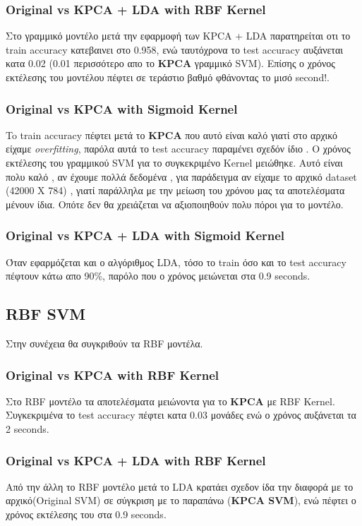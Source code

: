 \subsubsection{Original vs KPCA + LDA with RBF Kernel}
Στο γραμμικό μοντέλο μετά την εφαρμοφή των KPCA + LDA  παρατηρείται οτι το train accuracy κατεβαινει στο 0.958, ενώ ταυτόχρονα το test accuracy αυξάνεται κατα 0.02 (0.01 περισσότερο απο το \textbf{KPCA} γραμμικό SVM). Επίσης ο χρόνος εκτέλεσης του μοντέλου πέφτει σε τεράστιο βαθμό φθάνοντας το μισό second!.

\subsubsection{Original vs KPCA with Sigmoid Kernel}
To train accuracy πέφτει μετά το \textbf{KPCA} που αυτό είναι καλό γιατί στο αρχικό είχαμε \emph{overfitting}, παρόλα αυτά το test accuracy παραμένει σχεδόν ίδιο . Ο χρόνος εκτέλεσης του
γραμμικού SVM για το συγκεκριμένο Kernel μειώθηκε. Αυτό είναι πολυ καλό , αν έχουμε πολλά δεδομένα , για παράδειγμα αν είχαμε το αρχικό dataset (42000 Χ 784) , γιατί παράλληλα με την μείωση του χρόνου μας τα αποτελέσματα μένουν ίδια. Οπότε δεν θα χρειάζεται να αξιοποιηθούν πολυ πόροι για το μοντέλο.

\subsubsection{Original vs KPCA + LDA with Sigmoid Kernel}
Όταν εφαρμόζεται και ο αλγόριθμος LDA, τόσο το train όσο και το test accuracy πέφτουν κάτω απο 90\%, παρόλο που ο χρόνος μειώνεται στα 0.9 seconds.

\subsection{RBF SVM}
Στην συνέχεια θα συγκριθούν τα RBF μοντέλα.
\subsubsection{Original vs KPCA with RBF Kernel}
Στο RBF μοντέλο τα αποτελέσματα μειώνοντα για το \textbf{KPCA} με RBF Kernel. Συγκεκριμένα το test accuracy πέφτει κατα 0.03 μονάδες ενώ ο χρόνος αυξάνεται τα 2 seconds.

\subsubsection{Original vs KPCA + LDA with RBF Kernel}
Από την άλλη το RBF μοντέλο μετά το LDA  κρατάει σχεδον ίδα την διαφορά με το αρχικό(Original SVM) σε σύγκριση με το παραπάνω (\textbf{KPCA SVM}), ενώ πέφτει ο χρόνος εκτέλεσης του στα 0.9 seconds.

